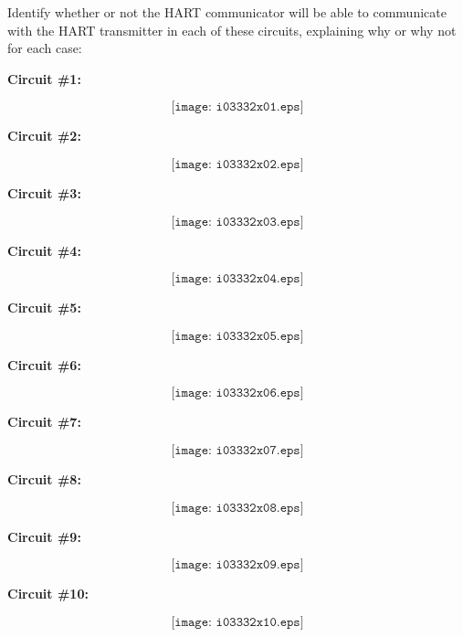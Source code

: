 

Identify whether or not the HART communicator will be able to communicate with the HART transmitter in each of these circuits, explaining why or why not for each case:

\vskip 20pt

\noindent
{\bf Circuit \#1:}

$$\texttt{[image: i03332x01.eps]}$$

\vskip 20pt
\noindent
{\bf Circuit \#2:}

$$\texttt{[image: i03332x02.eps]}$$

\filbreak

\vskip 20pt
\noindent
{\bf Circuit \#3:}

$$\texttt{[image: i03332x03.eps]}$$

\vskip 20pt
\noindent
{\bf Circuit \#4:}

$$\texttt{[image: i03332x04.eps]}$$

\filbreak

\vskip 20pt
\noindent
{\bf Circuit \#5:}

$$\texttt{[image: i03332x05.eps]}$$

\vskip 20pt
\noindent
{\bf Circuit \#6:}

$$\texttt{[image: i03332x06.eps]}$$

\filbreak

\vskip 20pt
\noindent
{\bf Circuit \#7:}

$$\texttt{[image: i03332x07.eps]}$$

\vskip 20pt
\noindent
{\bf Circuit \#8:}

$$\texttt{[image: i03332x08.eps]}$$

\filbreak

\vskip 20pt
\noindent
{\bf Circuit \#9:}

$$\texttt{[image: i03332x09.eps]}$$

\vskip 20pt
\noindent
{\bf Circuit \#10:}

$$\texttt{[image: i03332x10.eps]}$$








